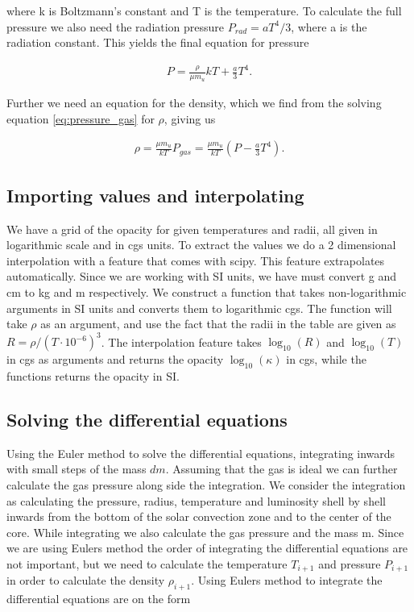 \documentclass[a4paper,10pt]{article}
\begin{document}
where k is Boltzmann's constant and T is the temperature. To calculate the full pressure we also need the radiation pressure $P_{rad} = aT^4/3$, where a is the radiation constant. This yields the final equation for pressure

\begin{align}\label{eq:pressure}
P = \frac{\rho}{\mu m_u} kT + \frac{a}{3}T^4.
\end{align}

Further we need an equation for the density, which we find from the solving equation \eqref{eq:pressure_gas} for $\rho$, giving us

\begin{align}\label{eq:density}
\rho = \frac{\mu m_u}{k T}P_{gas} = \frac{\mu m_u}{kT}(P - \frac{a}{3}T^4).
\end{align}




\subsection{Importing values and interpolating}
We have a grid of the opacity for given temperatures and radii, all given in logarithmic scale and in cgs units. To extract the values we do a 2 dimensional interpolation with a feature that comes with scipy. This feature extrapolates automatically. Since we are working with SI units, we have must convert g and cm to kg and m respectively. We construct a function that takes non-logarithmic arguments in SI units and converts them to logarithmic cgs. The function will take $\rho$ as an argument, and use the fact that the radii in the table are given as $R = \rho/(T\cdot10^{-6})^3$. The interpolation feature takes $\log_{10}(R)$ and $\log_{10}(T)$ in cgs as arguments and returns the opacity $\log_{10}(\kappa)$ in cgs, while the functions returns the opacity in SI.



\subsection{Solving the differential equations}
Using the Euler method to solve the differential equations, integrating inwards with small steps of the mass $dm$. Assuming that the gas is ideal we can further calculate the gas pressure along side the integration. We consider the integration as calculating the pressure, radius, temperature and luminosity shell by shell inwards from the bottom of the solar convection zone and to the center of the core. While integrating we also calculate the gas pressure and the mass m. Since we are using Eulers method the order of integrating the differential equations are not important, but we need to calculate the temperature $T_{i+1}$ and pressure $P_{i+1}$ in order to calculate the density $\rho_{i+1}$. Using Eulers method to integrate the differential equations are on the form
\end{document}

